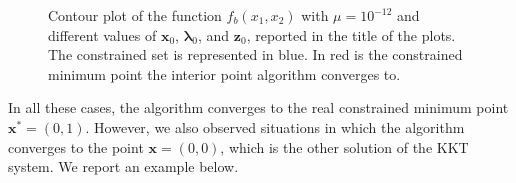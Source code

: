 \documentclass[a4paper,11pt]{article}
\begin{document}
\begin{figure}[H]
	\caption{Contour plot of the function $f_{b}(x_{1},x_{2})$ with $\mu=10^{-12}$ and different values of $\textbf{x}_{0}$, $\boldsymbol{\lambda}_{0}$, and $\textbf{z}_{0}$, reported in the title of the plots. The constrained set is represented in blue. In red is the constrained minimum point the interior point algorithm converges to.}
	\label{Fig:func_b_diff_x0}
\end{figure}

\noindent In all these cases, the algorithm converges to the real constrained minimum point $\textbf{x}^*=(0,1)$. However, we also observed situations in which the algorithm converges to the point $\textbf{x}=(0,0)$, which is the other solution of the KKT system. We report an example below.
\end{document}
